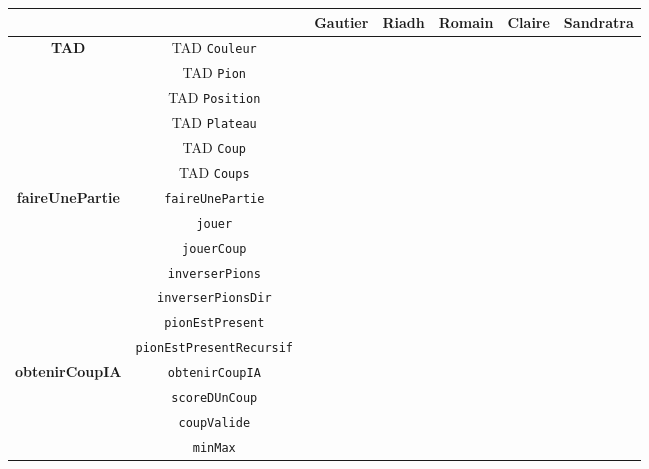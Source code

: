 \documentclass[11pt]{report}
\begin{document}
\begin{table}[h]
\begin{center}
\begin{tabular}{|c|c|c|c|c|c|c|}
  \cline{3-7}
   \multicolumn{2}{c|}{ }  & {\footnotesize\textbf{Gautier}} &  {\footnotesize\textbf{Riadh}} & {\footnotesize\textbf{Romain}} & {\footnotesize\textbf{Claire}} & { \footnotesize\textbf{Sandratra}}\\ \hline
     \multirow{6}{*}{{\footnotesize\textbf{TAD}}} &  TAD \tt{Couleur} & & & &\cellcolor{lightgray} & \\ \cline{2-7}
     			 &  TAD \tt{Pion} & & & &\cellcolor{lightgray} & \\ \cline{2-7}
       		 &  TAD \tt{Position} & & & &\cellcolor{lightgray} & \\ \cline{2-7}
       		 &  TAD \tt{Plateau} & \cellcolor{lightgray} & & & & \\ \cline{2-7}
       		 &  TAD \tt{Coup} & \cellcolor{lightgray} & & & & \\ \cline{2-7}
       		 &  TAD \tt{Coups} & \cellcolor{lightgray} & & & & \\ \hline
      \multirow{7}{*}{{\footnotesize\textbf{faireUnePartie}}}  &\tt{faireUnePartie} & & \cellcolor{lightgray}  & & & \\ \cline{2-7}
      			&\tt{jouer} & & & & & \cellcolor{lightgray} \\ \cline{2-7}
      			&\tt{jouerCoup} & & & &  \cellcolor{lightgray}   & \\ \cline{2-7}
      			&\tt{inverserPions} & & \cellcolor{lightgray}  & &\cellcolor{lightgray} & \cellcolor{lightgray} \\ \cline{2-7}
      			&\tt{inverserPionsDir} & & \cellcolor{lightgray}  & &\cellcolor{lightgray} & \cellcolor{lightgray} \\ \cline{2-7}
      			&\tt{pionEstPresent} & & & &  \cellcolor{lightgray}   & \\ \cline{2-7}
      			&\tt{pionEstPresentRecursif} & & & &  \cellcolor{lightgray}   & \\ \hline
      	\multirow{8}{*}{{\footnotesize\textbf{obtenirCoupIA}}} & \tt{obtenirCoupIA} & \cellcolor{lightgray} & &\cellcolor{lightgray} & & \\\cline{2-7}
				 & \tt{scoreDUnCoup} & \cellcolor{lightgray} & &\cellcolor{lightgray} & & \\\cline{2-7}
				 & \tt{coupValide} &  & &  & \cellcolor{lightgray} & \\\cline{2-7}
				 & \tt{minMax} & \cellcolor{lightgray} & &\cellcolor{lightgray} & & \\ \cline{2-7}

\end{tabular}
\end{center}
\end{table}
\end{document}

